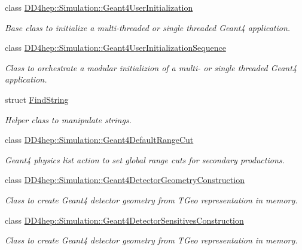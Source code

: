 \begin{DoxyCompactItemize}
class \hyperlink{class_d_d4hep_1_1_simulation_1_1_geant4_user_initialization}{DD4hep::Simulation::Geant4UserInitialization}
\begin{DoxyCompactList}\small\item\em Base class to initialize a multi-\/threaded or single threaded Geant4 application. \item\end{DoxyCompactList}\item 
class \hyperlink{class_d_d4hep_1_1_simulation_1_1_geant4_user_initialization_sequence}{DD4hep::Simulation::Geant4UserInitializationSequence}
\begin{DoxyCompactList}\small\item\em Class to orchestrate a modular initializion of a multi-\/ or single threaded Geant4 application. \item\end{DoxyCompactList}\item 
struct \hyperlink{struct_find_string}{FindString}
\begin{DoxyCompactList}\small\item\em Helper class to manipulate strings. \item\end{DoxyCompactList}\item 
class \hyperlink{class_d_d4hep_1_1_simulation_1_1_geant4_default_range_cut}{DD4hep::Simulation::Geant4DefaultRangeCut}
\begin{DoxyCompactList}\small\item\em Geant4 physics list action to set global range cuts for secondary productions. \item\end{DoxyCompactList}\item 
class \hyperlink{class_d_d4hep_1_1_simulation_1_1_geant4_detector_geometry_construction}{DD4hep::Simulation::Geant4DetectorGeometryConstruction}
\begin{DoxyCompactList}\small\item\em Class to create Geant4 detector geometry from TGeo representation in memory. \item\end{DoxyCompactList}\item 
class \hyperlink{class_d_d4hep_1_1_simulation_1_1_geant4_detector_sensitives_construction}{DD4hep::Simulation::Geant4DetectorSensitivesConstruction}
\begin{DoxyCompactList}\small\item\em Class to create Geant4 detector geometry from TGeo representation in memory. \item\end{DoxyCompactList}\item 

\end{DoxyCompactItemize}
